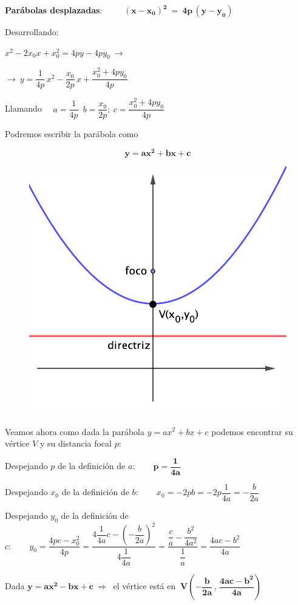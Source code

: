 \vspace{5mm}
\textbf{Parábolas desplazadas}: $\qquad \boxed{ \ \boldsymbol{(x-x_0)^2\ = \ 4p\, (y-y_0)} \ } $

\begin{multicols}{2}


Desarrollando: 

$x^2-2x_0x+x_0^2=4py-4py_0 \ \to $

$\to \ y=\dfrac 1{4p}\, x^2-\dfrac{x_0}{2p}\, x+\dfrac{x_0^2+4py_0}{4p}$

\vspace{1mm} Llamando $\quad a=\dfrac 1{4p}\; \ b=\dfrac{x_0}{2p};\ c= \dfrac{x_0^2+4py_0}{4p}$

\vspace{1mm} Podremos escribir la parábola como 

$$\boldsymbol{y=ax^2+bx+c}$$
\begin{figure}[H]
	\centering
	\includegraphics[width=.4\textwidth]{img-conicas/conicas36.png}
	\end{figure}	
\end{multicols}		

Veamos ahora como dada la parábola $y=ax^2+bx+c$ podemos encontrar su vértice $V$ y su distancia focal $p$:

Despejando $p$ de la definición de $a:\qquad \boldsymbol{ p=\dfrac 1{4a} }$

Despejando $x_0$ de la definición de $b:\qquad x_0=-2pb=-2p\dfrac{1}{4a}=-\dfrac{b}{2a}$

Despejando $y_0$ de la definición de $c:\qquad y_0=\dfrac{4pc-x_0^2}{4p}=\dfrac{4\dfrac{1}{4a}c-\left(-\dfrac{b}{2a} \right)^2}{4\dfrac{1}{4a}}=\dfrac{\dfrac c a - \dfrac{b^2}{4a^2}}{\dfrac 1 a}=\dfrac{4ac-b^2}{4a}$

\begin{adjustwidth}{25pt}{25pt}
\begin{destacado}	
Dada $\boldsymbol{ y=ax^2-bx+c} \ \Rightarrow \ $ el vértice está en $\ \boldsymbol {V\left( -\dfrac{b}{2a} \, , \, \dfrac{4ac-b^2}{4a} \right) } $
\end{destacado}
\end{adjustwidth}

